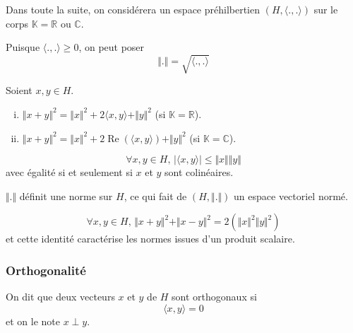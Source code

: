 	Dans toute la suite, on considérera un espace préhilbertien $(H, \langle ., . \rangle)$ sur le corps $\mathbb{K} = \mathbb{R} \text{ ou } \mathbb{C}$.
	
	\begin{notation}
		Puisque $\langle ., . \rangle \geq 0$, on peut poser
		\[ \Vert . \Vert = \sqrt{\langle ., . \rangle} \]
	\end{notation}
	
	\begin{proposition}
		\label{213-1}
		Soient $x, y \in H$.
		\begin{enumerate}[(i)]
			\item $\Vert x + y \Vert^2 = \Vert x \Vert^2 + 2 \langle x, y \rangle + \Vert y \Vert^2$ (si $\mathbb{K} = \mathbb{R}$).
			\item $\Vert x + y \Vert^2 = \Vert x \Vert^2 + 2 \operatorname{Re}(\langle x, y \rangle) + \Vert y \Vert^2$ (si $\mathbb{K} = \mathbb{C}$).
		\end{enumerate}
	\end{proposition}
	
	\begin{theorem}
		\[ \forall x, y \in H, \, \vert \langle x, y \rangle \vert \leq \Vert x \Vert \Vert y \Vert \]
		avec égalité si et seulement si $x$ et $y$ sont colinéaires.
	\end{theorem}
	
	\begin{corollary}
		$\Vert . \Vert$ définit une norme sur $H$, ce qui fait de $(H, \Vert . \Vert)$ un espace vectoriel normé.
	\end{corollary}
	
	
	\begin{proposition}
		\[ \forall x, y \in H, \, \Vert x + y \Vert^2 + \Vert x - y \Vert^2 = 2(\Vert x \Vert^2 \Vert y \Vert^2) \]
		et cette identité caractérise les normes issues d'un produit scalaire.
	\end{proposition}
	
	\subsubsection{Orthogonalité}
	
	
	\begin{definition}
		On dit que deux vecteurs $x$ et $y$ de $H$ sont orthogonaux si
		\[ \langle x, y \rangle = 0 \]
		et on le note $x \perp y$.
	\end{definition}
	
